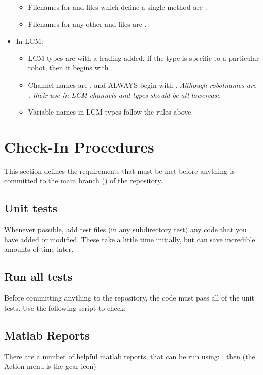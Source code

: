 \begin{itemize}
\begin{itemize}
\item Filenames for  and  files which define a single method are .  
\item Filenames for any other  and  files are .
\end{itemize}
\item In LCM:
\begin{itemize}
\item LCM types are  with a leading  added. If the type is specific to a particular robot, then it begins with .
\item Channel names are , and ALWAYS begin with . 
  \emph{Although robotnames are , their use in LCM channels and types should be all lowercase}
\item Variable names in LCM types follow the rules above.
\end{itemize}
\end{itemize}


\section{Check-In Procedures}

This section defines the requirements that must be met before anything 
is committed to the main branch () of the \robotlib repository.

\subsection{Unit tests}

  Whenever possible, add test files (in any subdirectory test) any code 
  that you have added or modified.  These take a little time initially, 
  but can save incredible amounts of time later.

\subsection{Run all tests}

  Before committing anything to the repository, the code must pass all of 
  the unit tests.  Use the following script to check:

\subsection{Matlab Reports}
  There are a number of helpful matlab reports, that can be run using: 
    ,
  then 
      (the Action menu is the gear icon)

